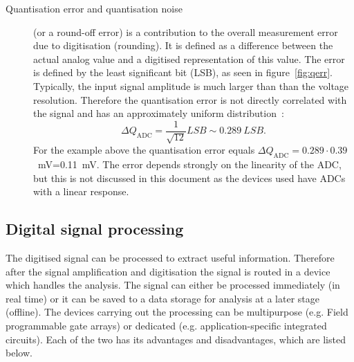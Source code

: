 \begin{description}
\item[Quantisation error and quantisation noise] (or a round-off error) is a contribution to the overall measurement error due to digitisation (rounding). It is defined as a difference between the actual analog value and a digitised representation of this value. The error is defined by the least significant bit (LSB), as seen in figure~\ref{fig:qerr}. Typically, the input signal amplitude is much larger than than the voltage resolution. Therefore the quantisation error is not directly correlated with the signal and has an approximately uniform distribution~\cite{}: 
\begin{equation}
\label{eq:qerr}
\Delta Q_\mathrm{ADC}=\frac{1}{\sqrt{12}}LSB\sim0.289~LSB.
\end{equation} 
For the example above the quantisation error equals $\Delta Q_\mathrm{ADC}=0.289\cdot 0.39$~mV=0.11~mV. The error depends strongly on the linearity of the ADC, but this is not discussed in this document as the devices used have ADCs with a linear response.
\end{description}

\subsection{Digital signal processing}
The digitised signal can be processed to extract useful information. Therefore after the signal amplification and digitisation the signal is routed in a device which handles the analysis. The signal can either be processed immediately (in real time) or it can be saved to a data storage for analysis at a later stage (offline). The devices carrying out the processing can be multipurpose (e.g. Field programmable gate arrays) or dedicated (e.g. application-specific integrated circuits). Each of the two has its advantages and disadvantages, which are listed below. 

